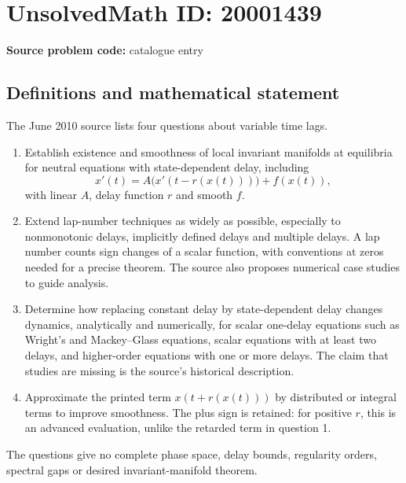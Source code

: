 \documentclass[11pt]{article}
\begin{document}
\section*{UnsolvedMath ID: 20001439}
\textbf{Source problem code:} catalogue entry
\subsection{Definitions and mathematical statement}
The June 2010 source lists four questions about variable time lags.
\begin{enumerate}
\item Establish existence and smoothness of local invariant manifolds at equilibria for neutral equations with state-dependent delay, including
\[
 x'(t)=A\bigl(x'(t-r(x(t)))\bigr)+f(x(t)),
\]
with linear \(A\), delay function \(r\) and smooth \(f\).
\item Extend lap-number techniques as widely as possible, especially to nonmonotonic delays, implicitly defined delays and multiple delays. A lap number counts sign changes of a scalar function, with conventions at zeros needed for a precise theorem. The source also proposes numerical case studies to guide analysis.
\item Determine how replacing constant delay by state-dependent delay changes dynamics, analytically and numerically, for scalar one-delay equations such as Wright's and Mackey--Glass equations, scalar equations with at least two delays, and higher-order equations with one or more delays. The claim that studies are missing is the source's historical description.
\item Approximate the printed term \(x(t+r(x(t)))\) by distributed or integral terms to improve smoothness. The plus sign is retained: for positive \(r\), this is an advanced evaluation, unlike the retarded term in question 1.
\end{enumerate}
The questions give no complete phase space, delay bounds, regularity orders, spectral gaps or desired invariant-manifold theorem.
\end{document}
